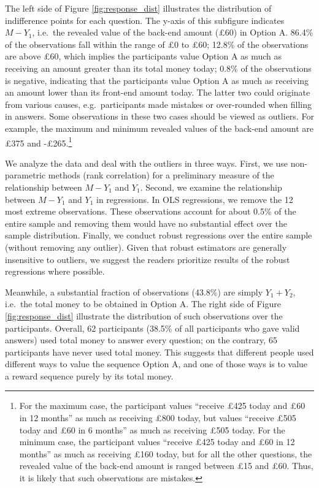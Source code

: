 \documentclass[
  12pt,
]{article}
\begin{document}
The left side of Figure \ref{fig:response_dist} illustrates the
distribution of indifference points for each question. The y-axis of
this subfigure indicates \(M - Y_1\), i.e.~the revealed value of the
back-end amount (£60) in Option A. 86.4\% of the observations fall
within the range of £0 to £60; 12.8\% of the observations are above £60,
which implies the participants value Option A as much as receiving an
amount greater than its total money today; 0.8\% of the observations is
negative, indicating that the participants value Option A as much as
receiving an amount lower than its front-end amount today. The latter
two could originate from various causes, e.g.~participants made mistakes
or over-rounded when filling in answers. Some observations in these two
cases should be viewed as outliers. For example, the maximum and minimum
revealed values of the back-end amount are £375 and -£265.\footnote{For
  the maximum case, the participant values ``receive £425 today and £60
  in 12 months'' as much as receiving £800 today, but values ``receive
  £505 today and £60 in 6 months'' as much as receiving £505 today. For
  the minimum case, the participant values ``receive £425 today and £60
  in 12 months'' as much as receiving £160 today, but for all the other
  questions, the revealed value of the back-end amount is ranged between
  £15 and £60. Thus, it is likely that such observations are mistakes.}

We analyze the data and deal with the outliers in three ways. First, we
use non-parametric methods (rank correlation) for a preliminary measure
of the relationship between \(M - Y_1\) and \(Y_1\). Second, we examine
the relationship between \(M - Y_1\) and \(Y_1\) in regressions. In OLS
regressions, we remove the 12 most extreme observations. These
observations account for about 0.5\% of the entire sample and removing
them would have no substantial effect over the sample distribution.
Finally, we conduct robust regressions over the entire sample (without
removing any outlier). Given that robust estimators are generally
insensitive to outliers, we suggest the readers prioritize results of
the robust regressions where possible.

Meanwhile, a substantial fraction of observations (43.8\%) are simply
\(Y_1 + Y_2\), i.e.~the total money to be obtained in Option A. The
right side of Figure \ref{fig:response_dist} illustrate the distribution
of such observations over the participants. Overall, 62 participants
(38.5\% of all participants who gave valid answers) used total money to
answer every question; on the contrary, 65 participants have never used
total money. This suggests that different people used different ways to
value the sequence Option A, and one of those ways is to value a reward
sequence purely by its total money.
\end{document}
